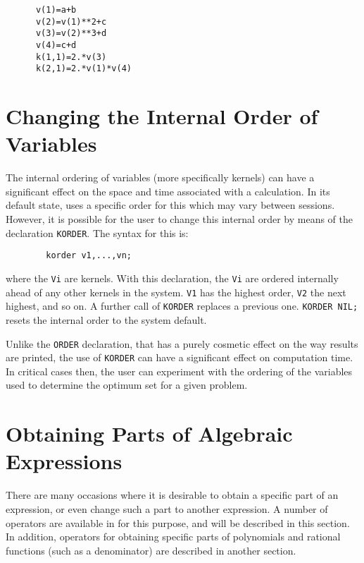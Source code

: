 \begin{verbatim}
      v(1)=a+b
      v(2)=v(1)**2+c
      v(3)=v(2)**3+d
      v(4)=c+d
      k(1,1)=2.*v(3)
      k(2,1)=2.*v(1)*v(4)
\end{verbatim}

\section{Changing the Internal Order of Variables}
\hypertarget{command:KORDER}{}

The internal ordering of variables (more specifically kernels) can have
a significant effect on the space and time associated with a calculation.
In its default state, {\REDUCE} uses a specific order for this which may
vary between sessions.  However, it is possible for the user to change
this internal order by means of the declaration
\texttt{KORDER}.
The syntax for this is:
\begin{verbatim}
        korder v1,...,vn;
\end{verbatim}
where the \texttt{Vi} are kernels.  With this declaration, the
\texttt{Vi} are ordered internally ahead of any other kernels in the system.
\texttt{V1} has the highest order, \texttt{V2} the next highest, and so on.  A
further call of \texttt{KORDER} replaces a previous one. \texttt{KORDER NIL;}
resets the internal order to the system default.

Unlike the \texttt{ORDER} declaration, that has a purely
cosmetic effect on the way results are printed, the use of \texttt{KORDER}
can have a significant effect on computation time.  In critical cases
then, the user can experiment with the ordering of the variables used to
determine the optimum set for a given problem.

\section{Obtaining Parts of Algebraic Expressions}

There are many occasions where it is desirable to obtain a specific part
of an expression, or even change such a part to another expression. A
number of operators are available in {\REDUCE} for this purpose, and will be
described in this section. In addition, operators for obtaining specific
parts of polynomials and rational functions (such as a denominator) are
described in another section.

